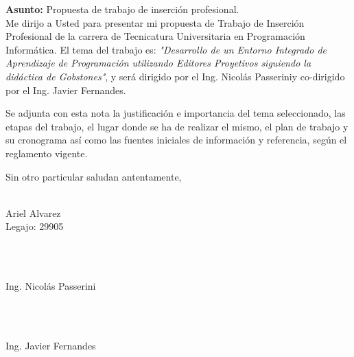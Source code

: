 \documentclass[10pt,stdletter]{newlfm}
\newcommand{\firma}[1]{%
  \vspace{2cm}
  \parbox{6cm}{
    \centering
    \hdashrule{6cm}{1pt}{1pt}\\
     #1
  }\textbf{}
}
\def \tipTitulo     {Desarrollo de un Entorno Integrado de Aprendizaje de Programación utilizando Editores Proyetivos siguiendo la didáctica de Gobstones}
\def \tipDirector   {Ing. Nicolás Passerini}
\def \tipCodirector {Ing. Javier Fernandes}
\def \alumnoLegajo  {29905}
\def \alumnoNombre  {Ariel Alvarez}
\def \cierre {%
    Sin otro particular saludan antentamente,
    \begin{center}
      \firma{\alumnoNombre \\ Legajo: \alumnoLegajo}\\
      \firma{\tipDirector}\\
      \firma{\tipCodirector}\\ 
    \end{center}
}
\begin{document}
\begin{newlfm}

\textbf{Asunto:} Propuesta de trabajo de inserción profesional.\\

Me dirijo a Usted para presentar mi propuesta de Trabajo de Inserción Profesional de la carrera de Tecnicatura Universitaria en Programación Informática. 
El tema del trabajo es: \textit{"\tipTitulo"}, y será dirigido por el \tipDirector y co-dirigido por el \tipCodirector.

Se adjunta con esta nota la justificación e importancia del tema seleccionado, las etapas del trabajo, el lugar donde se ha de realizar el mismo, el plan de trabajo y su cronograma así como las fuentes iniciales de información y referencia, según el reglamento vigente.

\cierre
\end{newlfm}
\end{document}
